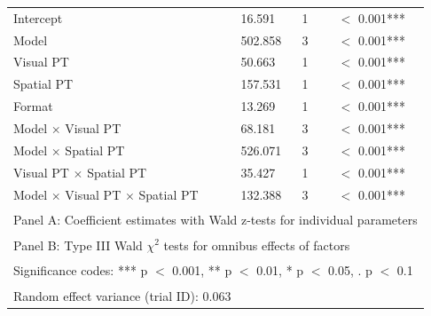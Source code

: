 \begin{table}[!h]
{\begin{tabular}[t]{lllll}
Intercept & 16.591 & 1 &  & $<$ 0.001***\\
Model & 502.858 & 3 &  & $<$ 0.001***\\
Visual PT & 50.663 & 1 &  & $<$ 0.001***\\
Spatial PT & 157.531 & 1 &  & $<$ 0.001***\\
Format & 13.269 & 1 &  & $<$ 0.001***\\
Model $\times$ Visual PT & 68.181 & 3 &  & $<$ 0.001***\\
Model $\times$ Spatial PT & 526.071 & 3 &  & $<$ 0.001***\\
Visual PT $\times$ Spatial PT & 35.427 & 1 &  & $<$ 0.001***\\
Model $\times$ Visual PT $\times$ Spatial PT & 132.388 & 3 &  & $<$ 0.001***\\
\bottomrule
\multicolumn{5}{l}{\textsuperscript{} Panel A: Coefficient estimates with Wald z-tests for individual parameters}\\
\multicolumn{5}{l}{\textsuperscript{} Panel B: Type III Wald $\chi^2$ tests for omnibus effects of factors}\\
\multicolumn{5}{l}{\textsuperscript{} Significance codes: *** p $<$ 0.001, ** p $<$ 0.01, * p $<$ 0.05, . p $<$ 0.1}\\
\multicolumn{5}{l}{\textsuperscript{} Random effect variance (trial ID): 0.063}\\
\end{tabular}}
\end{table}
